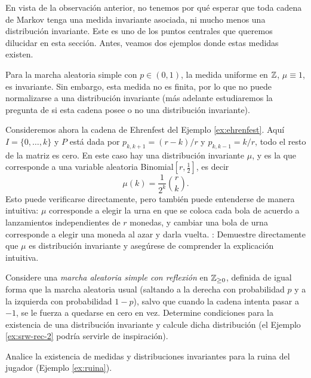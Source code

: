 En vista de la observación anterior, no tenemos por qué esperar que toda cadena de Markov tenga una medida invariante asociada, ni mucho menos una distribución invariante.
Este es uno de los puntos centrales que queremos dilucidar en esta sección.
Antes, veamos dos ejemplos donde estas medidas existen.

\begin{ex}\label{ex:srw-1-inv}
Para la marcha aleatoria simple con $p\in(0,1)$, la medida uniforme en $\mathbb{Z}$, $\mu\equiv1$, es invariante.
Sin embargo, esta medida no es finita, por lo que no puede normalizarse a una distribución invariante (más adelante estudiaremos la pregunta de si esta cadena posee o no una distribución invariante).
\end{ex}

\begin{ex}
Consideremos ahora la cadena de Ehrenfest del Ejemplo \ref{ex:ehrenfest}.
Aquí $I=\{0,\dotsc,k\}$ y $P$ está dada por $p_{k,k+1}=(r-k)/r$ y $p_{k,k-1}=k/r$, todo el resto de la matriz es cero.
En este caso hay una distribución invariante $\mu$, y es la que corresponde a una variable aleatoria Binomial$[r,\frac12]$, es decir
\[\mu(k)=\frac1{2^k}\binom{r}{k}.\]
Esto puede verificarse directamente, pero también puede entenderse de manera intuitiva: $\mu$ corresponde a elegir la urna en que se coloca cada bola de acuerdo a lanzamientos independientes de $r$ monedas, y cambiar una bola de urna corresponde a elegir una moneda al azar y darla vuelta.
\uexer: Demuestre directamente que $\mu$ es distribución invariante y asegúrese de comprender la explicación intuitiva.
\end{ex}

\begin{exer}
Considere una \emph{marcha aleatoria simple con reflexión} en $\mathbb{Z}_{\geq0}$, definida de igual forma que la marcha aleatoria usual (saltando a la derecha con probabilidad $p$ y a la izquierda con probabilidad $1-p$), salvo que cuando la cadena intenta pasar a $-1$, se le fuerza a quedarse en cero en vez.
Determine condiciones para la existencia de una distribución invariante y calcule dicha distribución (el Ejemplo \ref{ex:srw-rec-2} podría servirle de inspiración).
\end{exer}

\begin{exer}
Analice la existencia de medidas y distribuciones invariantes para la ruina del jugador (Ejemplo \ref{ex:ruina}).
\end{exer}

